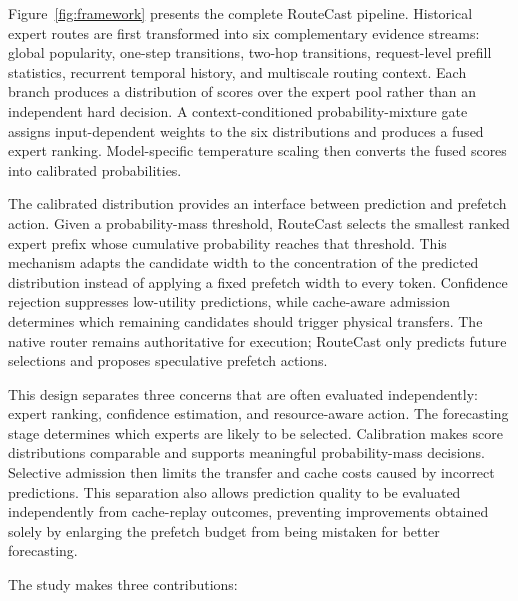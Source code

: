 \documentclass[conference]{IEEEtran}
\begin{document}
Figure~\ref{fig:framework} presents the complete RouteCast pipeline. Historical
expert routes are first transformed into six complementary evidence streams:
global popularity, one-step transitions, two-hop transitions, request-level
prefill statistics, recurrent temporal history, and multiscale routing
context. Each branch produces a distribution of scores over the expert pool
rather than an independent hard decision. A context-conditioned
probability-mixture gate assigns input-dependent weights to the six
distributions and produces a fused expert ranking. Model-specific temperature
scaling then converts the fused scores into calibrated probabilities.

The calibrated distribution provides an interface between prediction and
prefetch action. Given a probability-mass threshold, RouteCast selects the
smallest ranked expert prefix whose cumulative probability reaches that
threshold. This mechanism adapts the candidate width to the concentration of
the predicted distribution instead of applying a fixed prefetch width to every
token. Confidence rejection suppresses low-utility predictions, while
cache-aware admission determines which remaining candidates should trigger
physical transfers. The native router remains authoritative for execution;
RouteCast only predicts future selections and proposes speculative prefetch
actions.

This design separates three concerns that are often evaluated independently:
expert ranking, confidence estimation, and resource-aware action. The
forecasting stage determines which experts are likely to be selected.
Calibration makes score distributions comparable and supports meaningful
probability-mass decisions. Selective admission then limits the transfer and
cache costs caused by incorrect predictions. This separation also allows
prediction quality to be evaluated independently from cache-replay outcomes,
preventing improvements obtained solely by enlarging the prefetch budget from
being mistaken for better forecasting.

The study makes three contributions:
\end{document}

